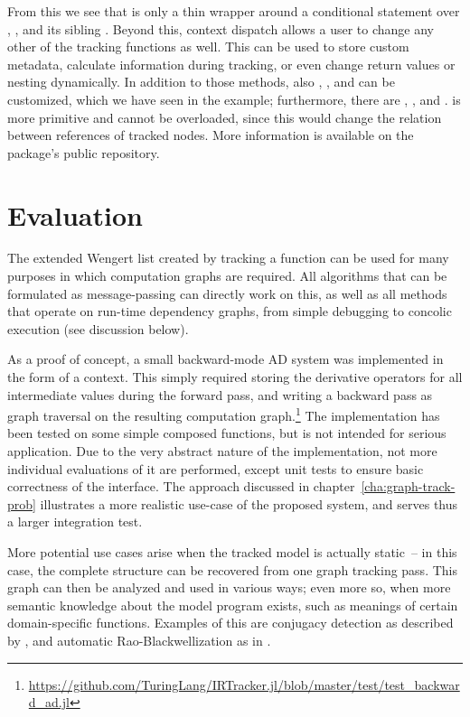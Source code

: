 From this we see that  is only a thin wrapper around a conditional statement over
, , and its sibling .  Beyond this,
context dispatch allows a user to change any other of the tracking functions as well.  This can be
used to store custom metadata, calculate information during tracking, or even change return values
or nesting dynamically.  In addition to those methods, also ,
, and  can be customized, which we have seen in the example;
furthermore, there are , , and .
 is more primitive and cannot be overloaded, since this would change the
relation between references of tracked nodes.  More information is available on the package's public
repository.

\section{Evaluation}
\label{sec:irtracker-eval}

The extended Wengert list created by tracking a function can be used for many purposes in which
computation graphs are required.  All algorithms that can be formulated as message-passing can
directly work on this, as well as all methods that operate on run-time dependency graphs, from
simple debugging to concolic execution (see discussion below).

As a proof of concept, a small backward-mode AD system was implemented in the form of a context.
This simply required storing the derivative operators for all intermediate values during the forward
pass, and writing a backward pass as graph traversal on the resulting computation
graph.\footnote{\href{https://github.com/TuringLang/IRTracker.jl/blob/760143734de1bf4e90da655d833e7999fc0ab2de/test/test_backward_ad.jl}{\url{https://github.com/TuringLang/IRTracker.jl/blob/master/test/test_backward_ad.jl}}}
The implementation has been tested on some simple composed functions, but is not intended for
serious application.  Due to the very abstract nature of the implementation, not more individual
evaluations of it are performed, except unit tests to ensure basic correctness of the interface.
The approach discussed in chapter~\ref{cha:graph-track-prob} illustrates a more realistic use-case
of the proposed system, and serves thus a larger integration test.

More potential use cases arise when the tracked model is actually static~-- in this case, the
complete structure can be recovered from one graph tracking pass.  This graph can then be analyzed
and used in various ways; even more so, when more semantic knowledge about the model program exists,
such as meanings of certain domain-specific functions.  Examples of this are conjugacy detection as
described by \textcite{hoffman2018autoconj}, and automatic Rao-Blackwellization as in
\textcite{murray2017delayed}.

